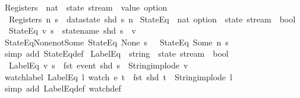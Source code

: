 \begin{isabellebody}
\isanewline
{}\isamarkupfalse%
\ Registers\ {\isacharcolon}{\isacharcolon}\ {\isachardoublequoteopen}nat\ {\isasymRightarrow}\ state\ stream\ {\isasymRightarrow}\ value\ option{\isachardoublequoteclose}\ \isanewline
\ \ {\isachardoublequoteopen}Registers\ n\ s\ {\isasymequiv}\ datastate\ {\isacharparenleft}shd\ s{\isacharparenright}\ n{\isachardoublequoteclose}\isanewline
\isanewline
{}\isamarkupfalse%
\ StateEq\ {\isacharcolon}{\isacharcolon}\ {\isachardoublequoteopen}nat\ option\ {\isasymRightarrow}\ state\ stream\ {\isasymRightarrow}\ bool{\isachardoublequoteclose}\ \isanewline
\ \ {\isachardoublequoteopen}StateEq\ v\ s\ {\isasymequiv}\ statename\ {\isacharparenleft}shd\ s{\isacharparenright}\ {\isacharequal}\ v{\isachardoublequoteclose}\isanewline
\isanewline
{}\isamarkupfalse%
\ StateEq{\isacharunderscore}None{\isacharunderscore}not{\isacharunderscore}Some{\isacharcolon}\ {\isachardoublequoteopen}StateEq\ None\ s\ {\isasymLongrightarrow}\ {\isasymnot}\ StateEq\ {\isacharparenleft}Some\ n{\isacharparenright}\ s{\isachardoublequoteclose}\isanewline
%
\isadelimproof
\ \ %
\endisadelimproof
%
\isatagproof
{}\isamarkupfalse%
\ {\isacharparenleft}simp\ add{\isacharcolon}\ StateEq{\isacharunderscore}def{\isacharparenright}%
\endisatagproof
{\isafoldproof}%
%
\isadelimproof
\isanewline
%
\endisadelimproof
\isanewline
{}\isamarkupfalse%
\ LabelEq\ {\isacharcolon}{\isacharcolon}\ {\isachardoublequoteopen}string\ {\isasymRightarrow}\ state\ stream\ {\isasymRightarrow}\ bool{\isachardoublequoteclose}\ \isanewline
\ \ {\isachardoublequoteopen}LabelEq\ v\ s\ {\isasymequiv}\ fst\ {\isacharparenleft}event\ {\isacharparenleft}shd\ s{\isacharparenright}{\isacharparenright}\ {\isacharequal}\ {\isacharparenleft}String{\isachardot}implode\ v{\isacharparenright}{\isachardoublequoteclose}\isanewline
\isanewline
{}\isamarkupfalse%
\ watch{\isacharunderscore}label{\isacharcolon}\ {\isachardoublequoteopen}LabelEq\ l\ {\isacharparenleft}watch\ e\ t{\isacharparenright}\ {\isacharequal}\ {\isacharparenleft}fst\ {\isacharparenleft}shd\ t{\isacharparenright}\ {\isacharequal}\ String{\isachardot}implode\ l{\isacharparenright}{\isachardoublequoteclose}\isanewline
%
\isadelimproof
\ \ %
\endisadelimproof
%
\isatagproof
{}\isamarkupfalse%
\ {\isacharparenleft}simp\ add{\isacharcolon}\ LabelEq{\isacharunderscore}def\ watch{\isacharunderscore}def{\isacharparenright}%
\endisatagproof
{\isafoldproof}%
%
\isadelimproof

\end{isabellebody}
